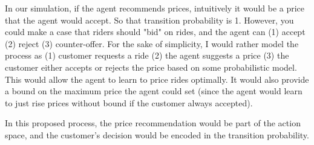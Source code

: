 \documentclass[12pt]{article}
\begin{document}
In our simulation, if the agent recommends prices, intuitively it would be a price that the agent
would accept. So that transition probability is 1. However, you could make a case that riders
should "bid" on rides, and the agent can (1) accept (2) reject (3) counter-offer. For the sake
of simplicity, I would rather model the process as (1) customer requests a ride (2) the agent
suggests a price (3) the customer either accepts or rejects the price based on some
probabilistic model. This would allow the agent to learn to price rides optimally. It would also
provide a bound on the maximum price the agent could set (since the agent would learn to just rise
prices without bound if the customer always accepted).

In this proposed process, the price recommendation would be part of the action space, and the
customer's decision would be encoded in the transition probability.
\end{document}
